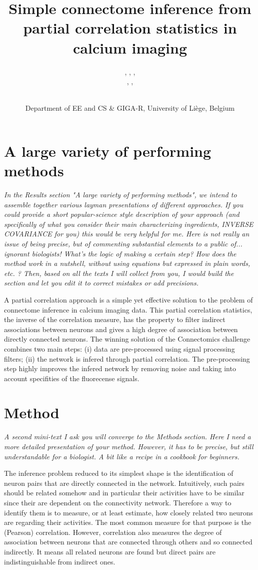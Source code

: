 \documentclass[wcp]{jmlr}
\title{Simple connectome inference from partial correlation statistics in calcium imaging}
\author{\Name{Antonio Sutera},
   \Name{Arnaud Joly},
   \Name{Vincent François-Lavet}, \Email{a.sutera@ulg.ac.be}\\
   \Name{Zixiao Aaron Qiu},
   \Name{Gilles Louppe},
   \Name{Damien Ernst}\and\Name{Pierre Geurts}
    \\
   \addr Department of EE and CS \& GIGA-R, University of Li\`ege, Belgium}
\begin{document}
\section{A large variety of performing methods}

\emph{
In the Results section "A large variety of performing methods", we intend to
assemble together various layman presentations of different approaches. If you
could provide a short popular-science style description of your approach (and
specifically of what you consider their main characterizing ingredients,
INVERSE COVARIANCE for you) this would be very helpful for me.  Here is not
really an issue of being precise, but of commenting substantial elements to a
public of... ignorant biologists! What's the logic of making a certain step?
How does the method work in a nutshell, without using equations but expressed
in plain words, etc. ? Then, based on all the texts I will collect from you, I
would build the section and let you edit it to correct mistakes or add
precisions.\\}


A partial correlation approach \cite{sutera2014simple}  is a simple yet
effective solution to the problem of connectome inference in calcium imaging
data. This partial correlation statistics, the inverse of the correlation
measure, has  the property to filter indirect associations between neurons and
gives a high degree of association between directly connected neurons. The
winning solution of the Connectomics challenge combines two main steps:
(i) data are pre-processed using signal processing filters; (ii)
the network is infered through partial correlation. The pre-processing step
highly improves the infered network by removing noise and taking into account
specifities of the fluorecense signals.


\section{Method}
\emph{A second mini-text I ask you will converge to the Methods section. Here I need
a more detailed presentation of your method. However, it has to be precise, but
still understandable for a biologist. A bit like a recipe in a cookbook for
beginners.\\}

The inference problem reduced to its simplest shape is the identification of
neuron pairs that are directly connected in the network. Intuitively, such
pairs should be related somehow and in particular their activities have to be
similar since their are dependent on the connectivity network. Therefore a way
to identify them is to measure, or at least estimate, how closely related two
neurons are regarding their activities. The most common measure for that
purpose is the (Pearson) correlation.  However, correlation also measures the
degree of association between neurons that are connected through others and so
connected indirectly. It means all related neurons are found but direct pairs
are indistinguishable from indirect ones.
\end{document}
